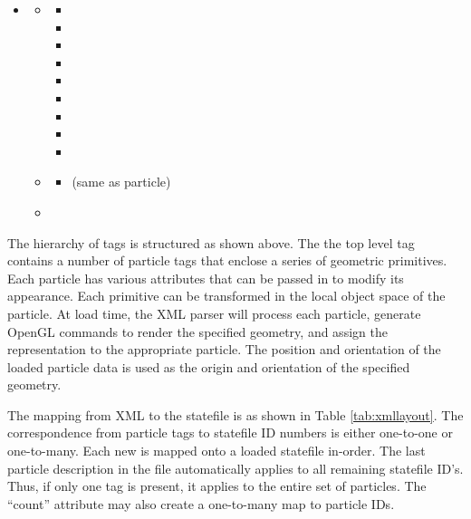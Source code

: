 \begin{itemize}
	\item {}
		\begin{itemize}
			\item {}
			\begin{itemize}		
				\item {}
				\item {}
				\item {}
				\item {}
				\item {}
				\item {}
				\item {}
				\item {}
				\item {}
			\end{itemize}
			\item {}
			\begin{itemize}
					\item (same as particle)
			\end{itemize}
			\item {}
		\end{itemize}
\end{itemize}

The hierarchy of tags is structured as shown above.  The the top level tag contains
a number of particle tags that enclose a series of geometric primitives.  Each particle has various
attributes that can be passed in to modify its appearance. 
Each primitive can be transformed in the local object space of the particle.  At load time, the XML parser
will process each particle, generate OpenGL commands to render the specified geometry, and assign the representation
to the appropriate particle.  The position and orientation of the loaded particle data is used as the origin and orientation of the specified geometry.

The mapping from XML to the statefile is as shown in Table \ref{tab:xmllayout}.  The correspondence from particle tags
to statefile ID numbers is either one-to-one or one-to-many.  Each new  is mapped onto a loaded statefile in-order.  The last particle description in the file automatically applies to all remaining statefile ID's.  Thus, if only one  tag is present, it applies to the entire set of particles.  The ``count'' attribute may also create a one-to-many map to particle IDs.


